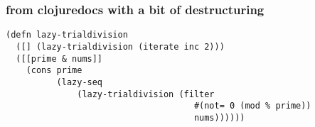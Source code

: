 \documentclass{beamer}
\begin{document}
\begin{frame}[fragile]
\frametitle{from clojuredocs with a bit of destructuring}
\begin{verbatim}
(defn lazy-trialdivision
  ([] (lazy-trialdivision (iterate inc 2)))
  ([[prime & nums]]
    (cons prime
          (lazy-seq
              (lazy-trialdivision (filter
                                     #(not= 0 (mod % prime))
                                     nums))))))
\end{verbatim}

\end{frame}
\end{document}
